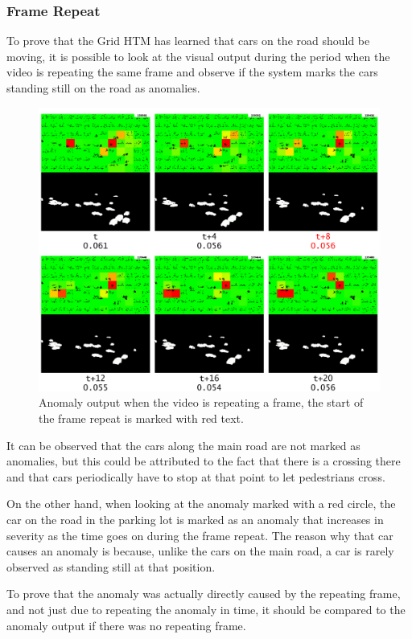 \subsubsection{Frame Repeat}
To prove that the Grid HTM has learned that cars on the road should be moving, it is possible to look at the visual output during the period when the video is repeating the same frame and observe if the system marks the cars standing still on the road as anomalies.
\begin{figure}[H]
    \centering
    \includegraphics[width=\textwidth]{resources/experiments/surveillance/surveillance_freeze_1.png}
    \caption{Anomaly output when the video is repeating a frame, the start of the frame repeat is marked with red text.}
\end{figure}
It can be observed that the cars along the main road are not marked as anomalies, but this could be attributed to the fact that there is a crossing there and that cars periodically have to stop at that point to let pedestrians cross.
\par
On the other hand, when looking at the anomaly marked with a red circle, the car on the road in the parking lot is marked as an anomaly that increases in severity as the time goes on during the frame repeat. The reason why that car causes an anomaly is because, unlike the cars on the main road, a car is rarely observed as standing still at that position.
\par
To prove that the anomaly was actually directly caused by the repeating frame, and not just due to repeating the anomaly in time, it should be compared to the anomaly output if there was no repeating frame.
